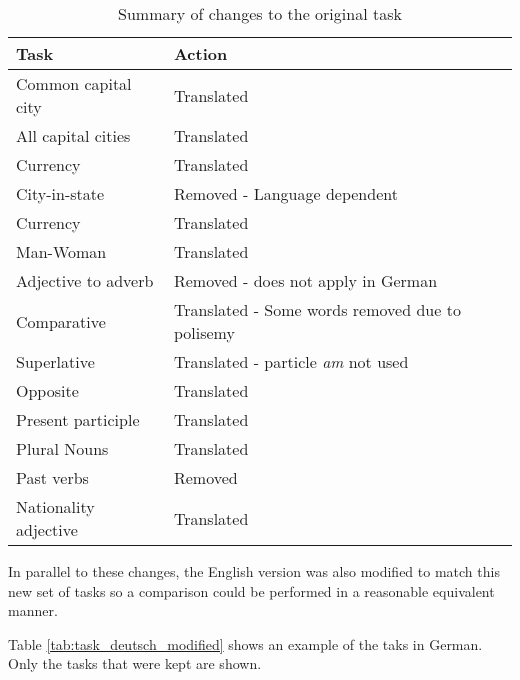  \begin{table}[h]
   \centering
   \caption{Summary of changes to the original task } 
   \label{tab:summary_of_changes_task}
   \small
   \begin{tabular}{ |l|l|  }

   \hline           
   Task  & Action   \\  \hline           
   Common capital city & Translated \\
   All capital cities  & Translated \\
   Currency & Translated  \\ 
   City-in-state   &  Removed - Language dependent \\
   Currency & Translated  \\
   Man-Woman  & Translated  \\
   Adjective to adverb  &  Removed - does not apply in German \\
   Comparative & Translated - Some words removed due to polisemy \\ 
   Superlative & Translated - particle \textit{am} not used \\
   Opposite  & Translated \\
   Present participle & Translated \\
   Plural Nouns  & Translated \\
   Past verbs &  Removed \\

   Nationality adjective & Translated \\
   
\hline

  
\end{tabular}
\end{table}
    
In parallel to these changes, the English version was also modified to match
this new set of tasks so a comparison could be performed in a reasonable
equivalent manner.  

Table \ref{tab:task_deutsch_modified} shows an example of the taks in German.
Only the tasks that were kept are shown.


